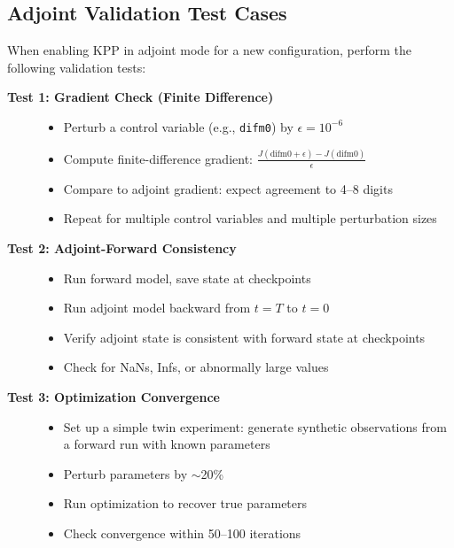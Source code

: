\documentclass[12pt,letterpaper]{article}
\begin{document}
\subsection{Adjoint Validation Test Cases}

When enabling KPP in adjoint mode for a new configuration, perform the following
validation tests:

\begin{description}
  \item[\textbf{Test 1: Gradient Check (Finite Difference)}]
  \begin{itemize}[leftmargin=*]
    \item Perturb a control variable (e.g., \texttt{difm0}) by $\epsilon = 10^{-6}$
    \item Compute finite-difference gradient: $\frac{J(\text{difm0} + \epsilon) - J(\text{difm0})}{\epsilon}$
    \item Compare to adjoint gradient: expect agreement to 4--8 digits
    \item Repeat for multiple control variables and multiple perturbation sizes
  \end{itemize}

  \item[\textbf{Test 2: Adjoint-Forward Consistency}]
  \begin{itemize}[leftmargin=*]
    \item Run forward model, save state at checkpoints
    \item Run adjoint model backward from $t = T$ to $t = 0$
    \item Verify adjoint state is consistent with forward state at checkpoints
    \item Check for NaNs, Infs, or abnormally large values
  \end{itemize}

  \item[\textbf{Test 3: Optimization Convergence}]
  \begin{itemize}[leftmargin=*]
    \item Set up a simple twin experiment: generate synthetic observations from
          a forward run with known parameters
    \item Perturb parameters by $\sim$20\%
    \item Run optimization to recover true parameters
    \item Check convergence within 50--100 iterations
  \end{itemize}
\end{description}
\end{document}
